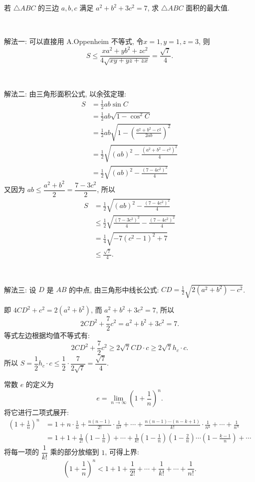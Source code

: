 \newpage
若 $\triangle ABC$ 的三边 $a,b,c$ 满足 $a^2+b^2+3c^2=7$, 求 $\triangle ABC$ 面积的最大值.

~

\noindent 解法一: 可以直接用 A.Oppenheim 不等式, 令$x=1,y=1,z=3$, 则
\[S\le\frac{xa^2+yb^2+zc^2}{4\sqrt{xy+yz+zx}} = \frac{\sqrt{7}}{4}. \]

~

\noindent 解法二: 由三角形面积公式, 以余弦定理:
\begin{align*}
S &= \frac{1}{2}ab\sin C \\
&= \frac{1}{2}ab\sqrt{1-\cos^2 C}\\
&= \frac{1}{2}ab\sqrt{1-\left(\frac{a^2+b^2-c^2}{2ab}\right)^2}\\
&= \frac{1}{2}\sqrt{(ab)^2-\frac{(a^2+b^2-c^2)^2}{4}}\\
&=\frac{1}{2}\sqrt{(ab)^2-\frac{(7-4c^2)^2}{4}}
\end{align*}
又因为 $ab\le\dfrac{a^2+b^2}{2}=\dfrac{7-3c^2}{2}$, 所以
\begin{align*}
S &=\frac{1}{2}\sqrt{(ab)^2-\frac{(7-4c^2)^2}{4}}\\
& \le\frac{1}{2}\sqrt{\frac{(7-3c^2)^2}{4}-\frac{(7-4c^2)^2}{4}}\\
&= \frac{1}{4}\sqrt{-7(c^2-1)^2+7}\\
&\le \frac{\sqrt{7}}{4}.
\end{align*}

~

\noindent 解法三: 设 $D$ 是 $AB$ 的中点, 由三角形中线长公式: $\displaystyle CD = \frac{1}{2}\sqrt{2(a^2+b^2)-c^2}$.

即 $4CD^2 + c^2 = 2(a^2+b^2)$, 而 $a^2+b^2+3c^2=7$, 所以
\[2CD^2+\frac{7}{2}c^2=a^2+b^2+3c^2=7.\]
等式左边根据均值不等式有: 
\[2CD^2+\frac{7}{2}c^2 \ge 2\sqrt{7}CD\cdot c\ge 2\sqrt{7}h_c\cdot c.\]
所以 $S=\dfrac{1}{2}h_c\cdot c \le \dfrac{1}{2}\cdot\dfrac{7}{2\sqrt{7}}=\dfrac{\sqrt{7}}{4}.$


\newpage

常数 $e$ 的定义为
\[e = \lim_{n\to\infty}\left(1+\frac{1}{n}\right)^n .\]
将它进行二项式展开:
\begin{align*}
\left(1+\frac{1}{n}\right)^n  &= 1 + n\cdot\frac{1}{n} + \frac{n(n-1)}{2!}\cdot\frac{1}{n^2} + \cdots + \frac{n(n-1)\cdots(n-k+1)}{k!}\cdot\frac{1}{n^k} + \cdots + \frac{1}{n^n} \\
&= 1 + 1 + \frac{1}{2!}(1-\frac{1}{n}) + \cdots + \frac{1}{k!}(1-\frac{1}{n})(1-\frac{2}{n})\cdots(1-\frac{k-1}{n}) + \cdots 
\end{align*}
将每一项的 $\dfrac{1}{k!}$ 乘的部分放缩到 $1$, 可得上界:
\[ \left(1+\frac{1}{n}\right)^n  < 1 + 1 + \frac{1}{2!} + \cdots + \frac{1}{k!} + \cdots + \frac{1}{n!} .\]

